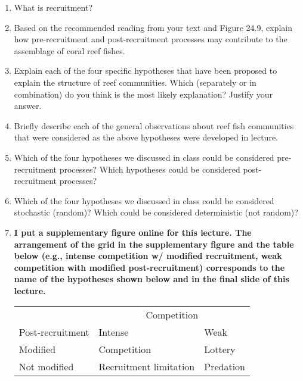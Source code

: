 \documentclass[letterpaper]{tufte-handout}
\begin{document}
\begin{enumerate}

	\item What is recruitment?
	
	\item Based on the recommended reading from your text and Figure 24.9, explain how pre-recruitment and post-recruitment processes may contribute to the assemblage of coral reef fishes.
	
	\item Explain each of the four specific hypotheses that have been proposed to explain the structure of reef communities.  Which (separately or in combination) do you think is the most likely explanation?  Justify your answer.

	\item Briefly describe each of the general observations about reef fish communities that were considered as the above hypotheses were developed in lecture.
	
	\item Which of the four hypotheses we discussed in class could be considered pre-recruitment processes? Which hypotheses could be considered post-recruitment processes?
	
	\item Which of the four hypotheses we discussed in class could be considered stochastic (random)?  Which could be considered deterministic (not random)?
	
	\item \textbf{I put a supplementary figure online for this lecture. The arrangement of the grid in the supplementary figure and the table below (e.g., intense competition w/ modified recruitment, weak competition with modified post-recruitment) corresponds to the name of the hypotheses shown below and in the final slide of this lecture.}
	
	\vspace*{\baselineskip}
	
	
	\begin{tabular}{lll}
	\toprule
	& \multicolumn{2}{c}{Competition} \tabularnewline
	\cmidrule(lr){2-3}
	Post-recruitment & Intense	& Weak \tabularnewline
	\midrule
	Modified & Competition & Lottery \tabularnewline
	Not modified & Recruitment limitation & Predation \tabularnewline
	\bottomrule
	\end{tabular}
	
	
\end{enumerate}
\end{document}
